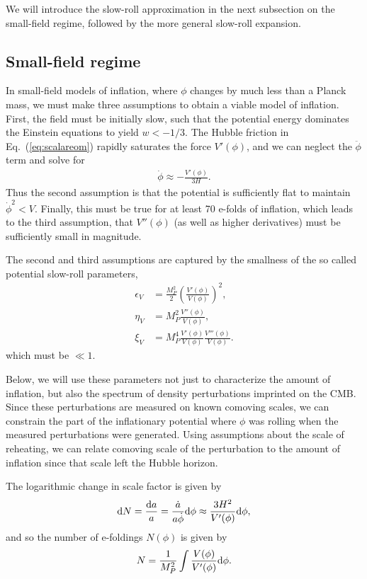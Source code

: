 \documentclass[aps,amsfonts,amsmath,prd,preprint,nofootinbib]{revtex4}
\newcommand{\MMp}{{M_P^2}}
\newcommand{\rmd}{{\rm d}}
\begin{document}
We will introduce the slow-roll approximation in the next subsection on  the small-field regime, followed by the more general
slow-roll expansion.



\subsection{Small-field regime}
In small-field models of inflation, where $\phi$ changes by much less than a Planck mass,
we must make three assumptions to obtain a viable model of inflation.  
First, the field must be initially slow, such that the potential energy dominates the Einstein equations to yield $w < -1/3$.
The Hubble friction in Eq.~(\ref{eq:scalareom}) rapidly saturates the force $V'(\phi)$, and we can neglect the $\ddot\phi$ term and solve for 
\begin{align}
\dot\phi \approx -\frac{V'(\phi)}{3 H}.
\end{align}
Thus the second assumption is that the potential is sufficiently flat to maintain $\dot\phi^2 < V$.
Finally, this must be true for at least 70 e-folds of inflation, which leads to the third assumption, 
that $V''(\phi)$ (as well as higher derivatives) must be sufficiently small in magnitude.

The second and third assumptions are captured by the smallness of the so called potential slow-roll parameters,
\begin{align}
\epsilon_V &= \frac{\MMp}{2}\left(\frac{V'(\phi)}{V(\phi)}\right)^2,\\
\eta_V &=  \MMp \frac{V''(\phi)}{V(\phi)},\\
\xi_V &= M^4_{P} \frac{V'(\phi)}{V(\phi)}\frac{V'''(\phi)}{V(\phi)}.
\end{align}
which must be $\ll 1$.

Below, we will use these parameters not just to characterize the amount of inflation, but also the spectrum
of density perturbations imprinted on the CMB.  Since these perturbations are measured on known comoving scales, we
can constrain the part of the inflationary potential where $\phi$ was rolling when the measured perturbations were generated.  Using assumptions about the
scale of reheating, we can relate comoving scale of the perturbation to the amount of inflation since that scale left the Hubble horizon.


The logarithmic change in scale factor is given by
\begin{align}
\rmd N = \frac{\rmd a}{a} = \frac{\dot a}{a\dot\phi}\rmd\phi \approx \frac{3H^2}{V'(\phi)}\rmd\phi,
\end{align}
and so the number of e-foldings $N(\phi)$ is given by
\begin{align}
N = \frac{1}{\MMp}\int \frac{V(\phi)}{V'(\phi)}\rmd\phi.
\end{align}
\end{document}
